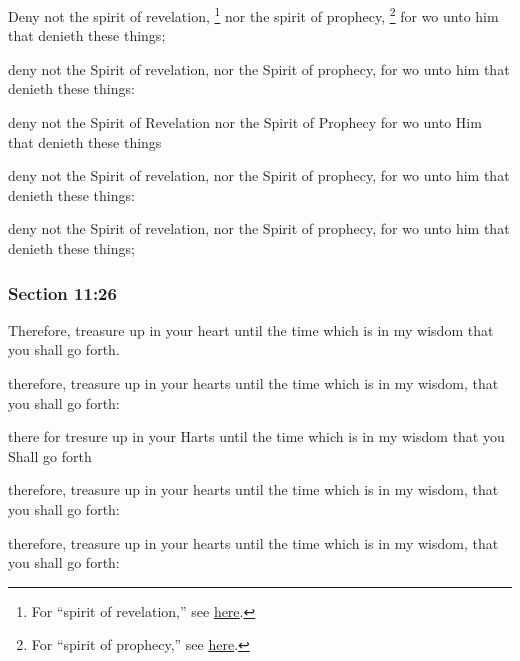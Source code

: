 		Deny not the spirit of revelation,%
			\footnote{%
				For ``spirit of revelation,'' see \hyperref[SPIRIT-PHRASES]{here}.	
				}
		nor the spirit of prophecy,%
			\footnote{%
				For ``spirit of prophecy,'' see \hyperref[SPIRIT-PHRASES]{here}.
				}
		for wo unto him that denieth these things;

		\begin{framed}
		\scriptsize
			\begin{compactdesc}
				\item[JSP] deny not the Spirit of revelation, nor the Spirit of prophecy, for wo unto him that denieth these things: 
				\item[HS] deny not the Spirit of Revelation nor the Spirit of Prophecy for wo unto Him that denieth these things 
				\item[DC 1835] deny not the Spirit of revelation, nor the Spirit of prophecy, for wo unto him that denieth these things: 
				\item[DC 1844] deny not the Spirit of revelation, nor the Spirit of prophecy, for wo unto him that denieth these things; 
			\end{compactdesc}
		\end{framed}

	\subsubsection{Section 11:26} %
		\label{DC11-26}

		Therefore, treasure up in your heart until the time which is in my wisdom that you shall go forth.

		\begin{framed}
		\scriptsize
			\begin{compactdesc}
				\item[JSP] therefore, treasure up in your hearts until the time which is in my wisdom, that you shall go forth: 
				\item[HS] there for tresure up in your Harts until the time which is in my wisdom that you Shall go forth 
				\item[DC 1835] therefore, treasure up in your hearts until the time which is in my wisdom, that you shall go forth: 
				\item[DC 1844] therefore, treasure up in your hearts until the time which is in my wisdom, that you shall go forth: 
			\end{compactdesc}
		\end{framed}

